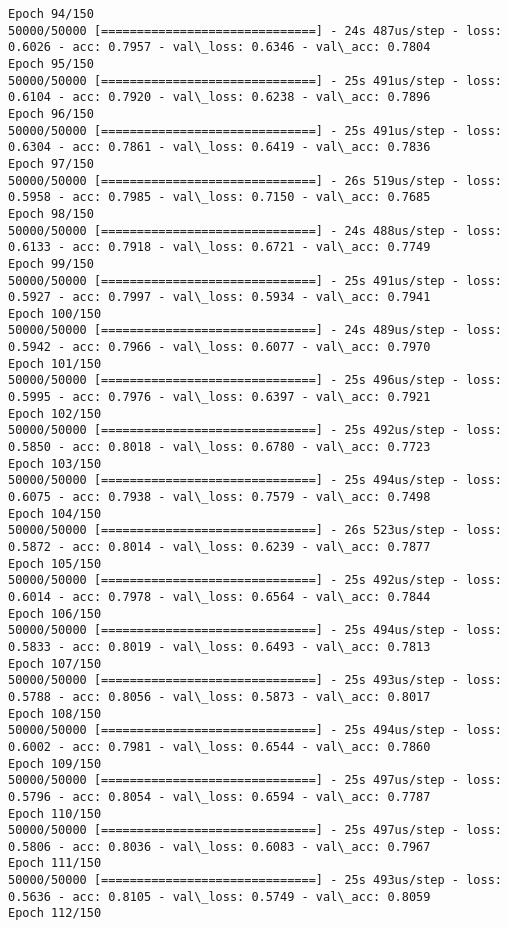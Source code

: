 \documentclass[11pt]{article}
\begin{document}
\begin{Verbatim}[commandchars=\\\{\}]
Epoch 94/150
50000/50000 [==============================] - 24s 487us/step - loss: 0.6026 - acc: 0.7957 - val\_loss: 0.6346 - val\_acc: 0.7804
Epoch 95/150
50000/50000 [==============================] - 25s 491us/step - loss: 0.6104 - acc: 0.7920 - val\_loss: 0.6238 - val\_acc: 0.7896
Epoch 96/150
50000/50000 [==============================] - 25s 491us/step - loss: 0.6304 - acc: 0.7861 - val\_loss: 0.6419 - val\_acc: 0.7836
Epoch 97/150
50000/50000 [==============================] - 26s 519us/step - loss: 0.5958 - acc: 0.7985 - val\_loss: 0.7150 - val\_acc: 0.7685
Epoch 98/150
50000/50000 [==============================] - 24s 488us/step - loss: 0.6133 - acc: 0.7918 - val\_loss: 0.6721 - val\_acc: 0.7749
Epoch 99/150
50000/50000 [==============================] - 25s 491us/step - loss: 0.5927 - acc: 0.7997 - val\_loss: 0.5934 - val\_acc: 0.7941
Epoch 100/150
50000/50000 [==============================] - 24s 489us/step - loss: 0.5942 - acc: 0.7966 - val\_loss: 0.6077 - val\_acc: 0.7970
Epoch 101/150
50000/50000 [==============================] - 25s 496us/step - loss: 0.5995 - acc: 0.7976 - val\_loss: 0.6397 - val\_acc: 0.7921
Epoch 102/150
50000/50000 [==============================] - 25s 492us/step - loss: 0.5850 - acc: 0.8018 - val\_loss: 0.6780 - val\_acc: 0.7723
Epoch 103/150
50000/50000 [==============================] - 25s 494us/step - loss: 0.6075 - acc: 0.7938 - val\_loss: 0.7579 - val\_acc: 0.7498
Epoch 104/150
50000/50000 [==============================] - 26s 523us/step - loss: 0.5872 - acc: 0.8014 - val\_loss: 0.6239 - val\_acc: 0.7877
Epoch 105/150
50000/50000 [==============================] - 25s 492us/step - loss: 0.6014 - acc: 0.7978 - val\_loss: 0.6564 - val\_acc: 0.7844
Epoch 106/150
50000/50000 [==============================] - 25s 494us/step - loss: 0.5833 - acc: 0.8019 - val\_loss: 0.6493 - val\_acc: 0.7813
Epoch 107/150
50000/50000 [==============================] - 25s 493us/step - loss: 0.5788 - acc: 0.8056 - val\_loss: 0.5873 - val\_acc: 0.8017
Epoch 108/150
50000/50000 [==============================] - 25s 494us/step - loss: 0.6002 - acc: 0.7981 - val\_loss: 0.6544 - val\_acc: 0.7860
Epoch 109/150
50000/50000 [==============================] - 25s 497us/step - loss: 0.5796 - acc: 0.8054 - val\_loss: 0.6594 - val\_acc: 0.7787
Epoch 110/150
50000/50000 [==============================] - 25s 497us/step - loss: 0.5806 - acc: 0.8036 - val\_loss: 0.6083 - val\_acc: 0.7967
Epoch 111/150
50000/50000 [==============================] - 25s 493us/step - loss: 0.5636 - acc: 0.8105 - val\_loss: 0.5749 - val\_acc: 0.8059
Epoch 112/150

\end{Verbatim}
\end{document}

